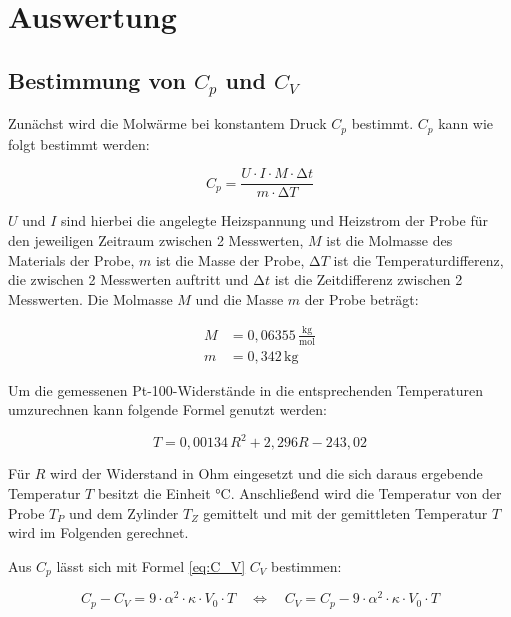 \section{Auswertung}
\label{sec:Auswertung}

\subsection{Bestimmung von $C_p$ und $C_V$}
\label{sec:C_p-C_V}

Zunächst wird die Molwärme bei konstantem Druck $C_p$ bestimmt. $C_p$ kann wie folgt bestimmt werden:

\begin{equation}
    C_p = \frac{U \cdot I \cdot M \cdot \increment t}{m \cdot \increment T}
    \label{eq:C_p}
\end{equation}

$U$ und $I$ sind hierbei die angelegte Heizspannung und Heizstrom der Probe für den jeweiligen Zeitraum zwischen 2 Messwerten, $M$ ist die Molmasse des Materials der Probe, $m$ ist die Masse der Probe, $\increment T$ ist die Temperaturdifferenz, die zwischen 2 Messwerten auftritt und $\increment t$ ist die Zeitdifferenz zwischen 2 Messwerten. Die Molmasse $M$ und die Masse $m$ der Probe beträgt:

\begin{align*}
    M &= 0, \! 06355 \, \frac{\mathrm{kg}}{\mathrm{mol}} \\
    m &= 0, \! 342 \, \mathrm{kg}
\end{align*}

Um die gemessenen Pt-100-Widerstände in die entsprechenden Temperaturen umzurechnen kann folgende Formel genutzt werden:

\begin{equation}
    T = 0, \! 00134 \, R^2 + 2, \! 296 R - 243, \! 02
\end{equation}

Für $R$ wird der Widerstand in Ohm eingesetzt und die sich daraus ergebende Temperatur $T$ besitzt die Einheit °C. Anschließend wird die Temperatur von der Probe $T_P$ und dem Zylinder $T_Z$ gemittelt und mit der gemittleten Temperatur $T$ wird im Folgenden gerechnet. 

Aus $C_p$ lässt sich mit Formel \eqref{eq:C_V} $C_V$ bestimmen:

\begin{equation}
    C_p - C_V = 9 \cdot \alpha^2 \cdot \kappa \cdot V_0 \cdot T \, \, \, \, \, \, \Leftrightarrow \, \, \, \, \, \, C_V = C_p - 9 \cdot \alpha^2 \cdot \kappa \cdot V_0 \cdot T
    \label{eq:C_V}
\end{equation}

